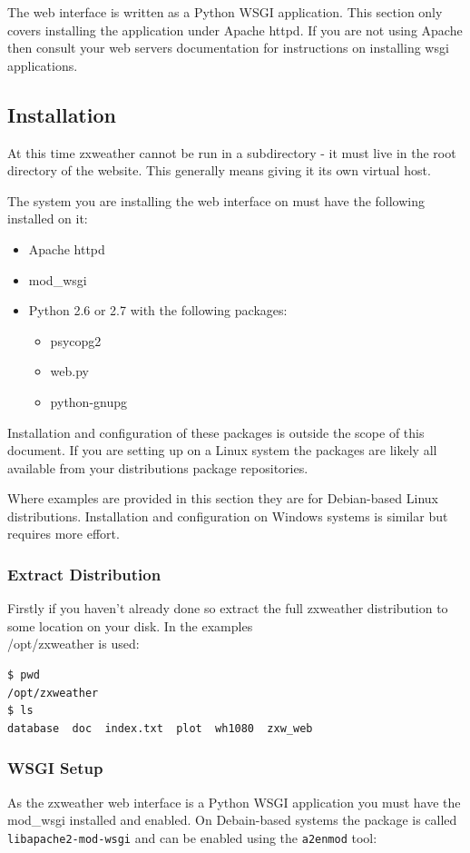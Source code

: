 \documentclass[a4paper,10pt,draft]{book}
\begin{document}
The web interface is written as a Python WSGI application. This section only covers installing the application under Apache httpd. If you are not using Apache then consult your web servers documentation for instructions on installing wsgi applications.

\subsection{Installation}

At this time zxweather cannot be run in a subdirectory - it must live in the root directory of the website. This generally means giving it its own virtual host.

The system you are installing the web interface on must have the following installed on it:
\begin{itemize}
\item Apache httpd
\item mod\_wsgi
\item Python 2.6 or 2.7 with the following packages:
\begin{itemize}
\item psycopg2
\item web.py
\item python-gnupg
\end{itemize}
\end{itemize}

Installation and configuration of these packages is outside the scope of this document. If you are setting up on a Linux system the packages are likely all available from your distributions package repositories. 

Where examples are provided in this section they are for Debian-based Linux distributions. Installation and configuration on Windows systems is similar but requires more effort.

\subsubsection{Extract Distribution}
Firstly if you haven't already done so extract the full zxweather distribution to some location on your disk. In the examples \\ /opt/zxweather is used:
\begin{verbatim}
$ pwd
/opt/zxweather
$ ls
database  doc  index.txt  plot  wh1080  zxw_web
\end{verbatim}

\subsubsection{WSGI Setup}
As the zxweather web interface is a Python WSGI application you must have the mod\_wsgi installed and enabled. On Debain-based systems the package is called \verb|libapache2-mod-wsgi| and can be enabled using the \verb|a2enmod| tool:
\end{document}
